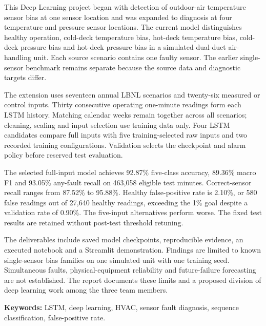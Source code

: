 This Deep Learning project began with detection of outdoor-air temperature sensor bias at one sensor location and was expanded to diagnosis at four temperature and pressure sensor locations. The current model distinguishes healthy operation, cold-deck temperature bias, hot-deck temperature bias, cold-deck pressure bias and hot-deck pressure bias in a simulated dual-duct air-handling unit. Each source scenario contains one faulty sensor. The earlier single-sensor benchmark remains separate because the source data and diagnostic targets differ.

The extension uses seventeen annual LBNL scenarios and twenty-six measured or control inputs. Thirty consecutive operating one-minute readings form each LSTM history. Matching calendar weeks remain together across all scenarios; cleaning, scaling and input selection use training data only. Four LSTM candidates compare full inputs with five training-selected raw inputs and two recorded training configurations. Validation selects the checkpoint and alarm policy before reserved test evaluation.

The selected full-input model achieves 92.87\% five-class accuracy, 89.36\% macro F1 and 93.05\% any-fault recall on 463,058 eligible test minutes. Correct-sensor recall ranges from 87.52\% to 95.88\%. Healthy false-positive rate is 2.10\%, or 580 false readings out of 27,640 healthy readings, exceeding the 1\% goal despite a validation rate of 0.90\%. The five-input alternatives perform worse. The fixed test results are retained without post-test threshold retuning.

The deliverables include saved model checkpoints, reproducible evidence, an executed notebook and a Streamlit demonstration. Findings are limited to known single-sensor bias families on one simulated unit with one training seed. Simultaneous faults, physical-equipment reliability and future-failure forecasting are not established. The report documents these limits and a proposed division of deep learning work among the three team members.

\textbf{Keywords:} LSTM, deep learning, HVAC, sensor fault diagnosis, sequence classification, false-positive rate.
\clearpage
{}
\hypersetup{pageanchor=true}
\tableofcontents
\clearpage
\listoftables
\listoffigures
\clearpage
{}
